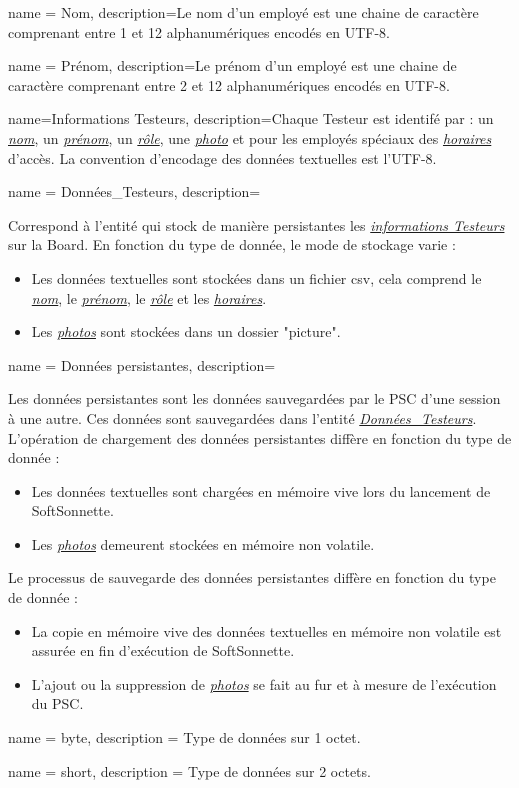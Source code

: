 {
    name = {Nom},
    description={\hypertarget{nom}{}Le nom d'un employé est une chaine de caractère comprenant entre 1 et 12 alphanumériques encodés en UTF-8.
    }
}

{
    name = {Prénom},
    description={\hypertarget{prenom}{}Le prénom d'un employé est une chaine de caractère comprenant entre 2 et 12 alphanumériques encodés en UTF-8.
    }
}

{
    name={Informations Testeurs},
    description={\hypertarget{caracEmploye}{}Chaque Testeur est identifé par : un \hyperlink{nom}{\textit{nom}}, un \hyperlink{prenom}{\textit{prénom}}, un \hyperlink{rol}{\textit{rôle}}, une \hyperlink{photo}{\textit{photo}} et pour les employés spéciaux des \hyperlink{hor}{\textit{horaires}} d'accès. 
    La convention d'encodage des données textuelles est l'UTF-8.
    }
}

{
    name = {Données\_Testeurs},
    description={\hypertarget{donneesTesteurs}{}Correspond à l'entité qui stock de manière persistantes les \hyperlink{caracEmploye}{\textit{informations Testeurs}} sur la Board.
    En fonction du type de donnée, le mode de stockage varie : 
    \begin{itemize}
        \item Les données textuelles sont stockées dans un fichier csv, cela comprend le \hyperlink{nom}{\textit{nom}}, le \hyperlink{prenom}{\textit{prénom}}, le \hyperlink{rol}{\textit{rôle}} et les \hyperlink{hor}{\textit{horaires}}.
        \item Les \hyperlink{photo}{\textit{photos}} sont stockées dans un dossier "picture".
    \end{itemize}
    }
}

{
    name = {Données persistantes},
    description={\hypertarget{donneesPersistantes}{}Les données persistantes sont les données sauvegardées par le PSC d'une session à une autre. 
    Ces données sont sauvegardées dans l'entité \hyperlink{donneesTesteurs}{\textit{Données\_Testeurs}}.
    L'opération de chargement des données persistantes diffère en fonction du type de donnée :
    \begin{itemize}
        \item Les données textuelles sont chargées en mémoire vive lors du lancement de SoftSonnette.
        \item Les \hyperlink{photo}{\textit{photos}} demeurent stockées en mémoire non volatile.
    \end{itemize}
    Le processus de sauvegarde des données persistantes diffère en fonction du type de donnée :
    \begin{itemize}
        \item La copie en mémoire vive des données textuelles en mémoire non volatile est assurée en fin d'exécution de SoftSonnette.
        \item L'ajout ou la suppression de \hyperlink{photo}{\textit{photos}} se fait au fur et à mesure de l'exécution du PSC.
    \end{itemize}
    }
}

{
    name = {byte},
    description ={ Type de données sur 1 octet.}
}

{
    name = {short},
    description ={ Type de données sur 2 octets.}
}
